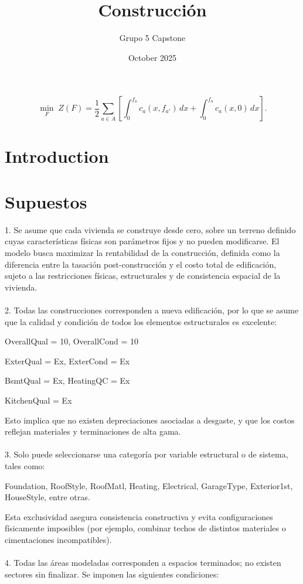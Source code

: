 \documentclass{article}
\title{Construcción}
\author{Grupo 5 Capstone}
\date{October 2025}
\begin{document}
\maketitle

\[
\min_{F}\; Z(F)
= \frac{1}{2}\sum_{a\in A}
\left[
  \int_{0}^{f_a} c_a(x,f_{a'})\,dx
  + 
  \int_{0}^{f_a} c_a(x,0)\,dx
\right].
\]
\section{Introduction}
\section{Supuestos}
1. Se asume que cada vivienda se construye desde cero, sobre un terreno definido cuyas características físicas son parámetros fijos y no pueden modificarse. El modelo busca maximizar la rentabilidad de la construcción, definida como la diferencia entre la tasación post-construcción y el costo total de edificación, sujeto a las restricciones físicas, estructurales y de consistencia espacial de la vivienda.\\
\\ 
2. Todas las construcciones corresponden a nueva edificación, por lo que se asume que la calidad y condición de todos los elementos estructurales es excelente:

OverallQual = 10, OverallCond = 10

ExterQual = Ex, ExterCond = Ex

BsmtQual = Ex, HeatingQC = Ex

KitchenQual = Ex

Esto implica que no existen depreciaciones asociadas a desgaste, y que los costos reflejan materiales y terminaciones de alta gama.
\\
\\
3. Solo puede seleccionarse una categoría por variable estructural o de sistema, tales como:

Foundation, RoofStyle, RoofMatl, Heating, Electrical, GarageType, Exterior1st, HouseStyle, entre otras.

Esta exclusividad asegura consistencia constructiva y evita configuraciones físicamente imposibles (por ejemplo, combinar techos de distintos materiales o cimentaciones incompatibles).\\
\\
4. Todas las áreas modeladas corresponden a espacios terminados; no existen sectores sin finalizar.
Se imponen las siguientes condiciones:
\end{document}
